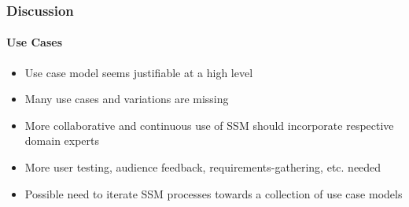 \documentclass{beamer}
\begin{document}
\begin{frame}
  \frametitle{Discussion}
  \framesubtitle{Use Cases}
  \begin{itemize}
    \item Use case model seems justifiable at a high level
    \item Many use cases and variations are missing
    \item More collaborative and continuous use of SSM should incorporate respective domain experts
    \item More user testing, audience feedback, requirements-gathering, etc. needed
    \item Possible need to iterate SSM processes towards a collection of use case models
  \end{itemize}
\end{frame}
\end{document}
